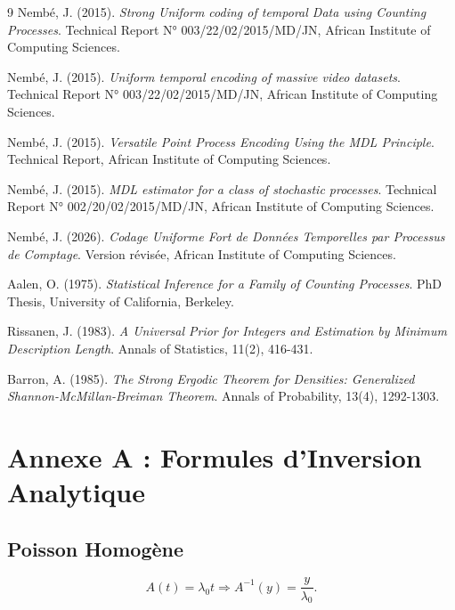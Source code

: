 \documentclass[12pt,a4paper]{article}
\begin{document}
	\begin{thebibliography}{9}
		Nembé, J. (2015). \textit{Strong Uniform coding of temporal Data using Counting Processes}. Technical Report N° 003/22/02/2015/MD/JN, African Institute of Computing Sciences.
		
		Nembé, J. (2015). \textit{Uniform temporal encoding of massive video datasets}. Technical Report N° 003/22/02/2015/MD/JN, African Institute of Computing Sciences.
		
		Nembé, J. (2015). \textit{Versatile Point Process Encoding Using the MDL Principle}. Technical Report, African Institute of Computing Sciences.
		
		Nembé, J. (2015). \textit{MDL estimator for a class of stochastic processes}. Technical Report N° 002/20/02/2015/MD/JN, African Institute of Computing Sciences.
		
		Nembé, J. (2026). \textit{Codage Uniforme Fort de Données Temporelles par Processus de Comptage}. Version révisée, African Institute of Computing Sciences.
		
		Aalen, O. (1975). \textit{Statistical Inference for a Family of Counting Processes}. PhD Thesis, University of California, Berkeley.
		
		Rissanen, J. (1983). \textit{A Universal Prior for Integers and Estimation by Minimum Description Length}. Annals of Statistics, 11(2), 416-431.
		
		Barron, A. (1985). \textit{The Strong Ergodic Theorem for Densities: Generalized Shannon-McMillan-Breiman Theorem}. Annals of Probability, 13(4), 1292-1303.
	\end{thebibliography}
	
	\newpage
	\appendix
	
	\section{Annexe A : Formules d'Inversion Analytique}
	\label{annexe:inversion}
	
	\subsection{Poisson Homogène}
	\begin{equation}
		A(t) = \lambda_0 t \Rightarrow A^{-1}(y) = \frac{y}{\lambda_0}.
	\end{equation}
	
\end{document}
